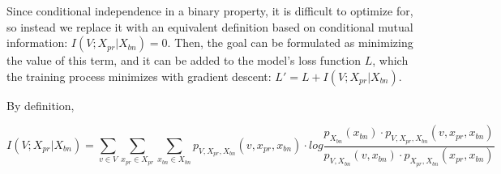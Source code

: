 Since conditional independence in a binary property, it is difficult to optimize
for, so instead we replace it with an equivalent definition based on conditional
mutual information: $I(V;X_{pr}|X_{bn}) = 0$. Then, the goal can be formulated
as minimizing the value of this term, and it can be added to the model’s loss
function $L$, which the training process minimizes with gradient descent:
$L' = L + I(V;X_{pr}|X_{bn})$.

By definition,

\begin{equation}
I(V;X_{pr}|X_{bn}) = \sum_{v \in V} \sum_{x_{pr} \in X_{pr}}
\sum_{x_{bn} \in X_{bn}} p_{V,X_{pr},X_{bn}}(v,x_{pr},x_{bn}) \cdot log
\frac{p_{X_{bn}}(x_{bn})\cdot p_{V,X_{pr},X_{bn}}(v,x_{pr},x_{bn})}
{p_{V,X_{bn}}(v,x_{bn}) \cdot p_{X_{pr},X_{bn}}(x_{pr},x_{bn})}
\end{equation}

